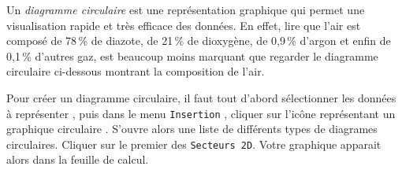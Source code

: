 Un \emph{diagramme circulaire} est une représentation graphique qui permet une visualisation rapide et très efficace des données. En effet, lire que l'air est composé de 78\,\% de diazote, de 21\,\% de dioxygène, de 0,9\,\% d'argon et enfin de 0,1\,\% d'autres gaz, est beaucoup moins marquant que regarder le diagramme circulaire ci-dessous montrant la composition de l'air.


Pour créer un diagramme circulaire, il faut tout d'abord sélectionner les données à représenter , puis dans le menu \texttt{Insertion} , cliquer sur l'icône représentant un graphique circulaire . S'ouvre alors une liste de différents types de diagrames circulaires. Cliquer sur le premier des \texttt{Secteurs 2D}. Votre graphique apparait alors dans la feuille de calcul.




